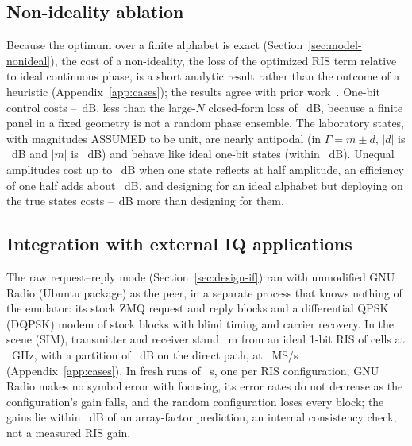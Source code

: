 \subsection{Non-ideality ablation}\label{sec:cases-ec}
Because the optimum over a finite alphabet is exact
(Section~\ref{sec:model-nonideal}), the cost of a non-ideality, the loss of the optimized RIS
term relative to ideal continuous phase, is a short analytic result rather than the outcome of
a heuristic (Appendix~\ref{app:cases}); the results agree with prior
work~\cite{WuZhang2020Discrete,Abeywickrama2020Practical}. One-bit control
costs \numEcOneBitMin--\numEcOneBitMax~dB, less than the large-$N$ closed-form loss of
\numEcOneBitEta~dB, because a finite panel in a fixed geometry is not a random phase ensemble.
The laboratory states, with magnitudes ASSUMED to be unit, are nearly antipodal (in
$\Gamma=m\pm d$, $|d|$ is \numEcAbsD~dB and $|m|$ is \numEcAbsM~dB) and behave like ideal one-bit
states (within \numEcLabVsOneBitMaxDb~dB). Unequal amplitudes cost up to \numEcHalfMaxDb~dB when
one state reflects at half amplitude, an efficiency of one half adds about \numEcEffExtraDb~dB,
and designing for an ideal alphabet but deploying on the true states costs
\numEcDesignPenaltyMinDb--\numEcDesignPenaltyMaxDb~dB more than designing for them.

\subsection{Integration with external IQ applications}\label{sec:cases-ee}
The raw request--reply mode (Section~\ref{sec:design-if}) ran with unmodified GNU
Radio \txtEeGrVersion{} (Ubuntu package) as the peer, in a separate process that knows nothing
of the emulator: its stock ZMQ request and reply blocks and a differential QPSK (DQPSK) modem
of stock blocks with blind timing and carrier recovery. In the scene (SIM), transmitter and receiver stand \numEeDistM~m
from an ideal 1-bit RIS of \numEeCells{} cells at \numEeFcGHz~GHz, with a partition of
\numEeWallDb~dB on the direct path, at \numEeRateMsps~MS/s (Appendix~\ref{app:cases}). In
\numEeConfigs{} fresh runs of \numEeStaticS~s, one per RIS configuration, GNU Radio makes no
symbol error with focusing, its error rates do not decrease as the configuration's gain
falls, and the random configuration loses every block; the gains lie within
\numEeAfMaxDiffDb~dB of an array-factor prediction, an internal consistency check, not a
measured RIS gain.

